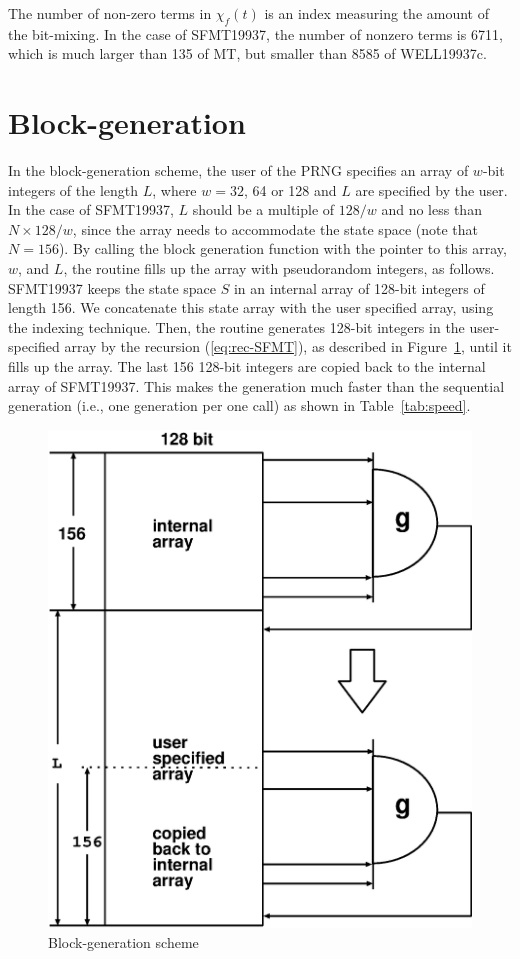 \documentclass[acmnow]{acmtrans2m}
\begin{document}
\begin{remark}
The number of non-zero terms in $\chi_f(t)$ is 
an index measuring the amount of the bit-mixing. 
In the case of SFMT19937, the number of nonzero 
terms is 6711, which is much larger than 135 of MT, 
but smaller than 8585 of WELL19937c. 
\end{remark}

\section{Block-generation}\label{sec:block}
In the block-generation scheme, 
the user of the PRNG specifies an array
of $w$-bit integers of the length $L$, 
where $w=32$, 64 or 128 and $L$ are specified
by the user.
In the case of SFMT19937,
$L$ should be a multiple of $128/w$
and no less than $N \times 128/w$,
since the array needs to accommodate the state space
(note that $N=156$).
By calling the block generation function 
with the pointer to this array, $w$, and $L$, 
the routine fills up the array with
pseudorandom integers, as follows. SFMT19937 keeps the state
space $S$ in an internal array of 128-bit integers of length 156.
We concatenate this state array with the user specified array, 
using the indexing technique.
Then, the routine generates 128-bit integers in the user-specified 
array by the recursion (\ref{eq:rec-SFMT}), as described
in Figure~\ref{fig:B1}, until it fills up the array.
The last 156 128-bit integers
are copied back to the internal array
of SFMT19937. 
This makes the generation much faster than the sequential generation
(i.e., one generation per one call) as shown in Table~\ref{tab:speed}.
\begin{figure}
\begin{center}
\includegraphics[width=0.7\linewidth,height=0.7\textheight,
keepaspectratio]{fill_array.eps}
\end{center}
\caption{Block-generation scheme}
\label{fig:B1}
\end{figure}



\begin{received}
\end{received}
\end{document}
